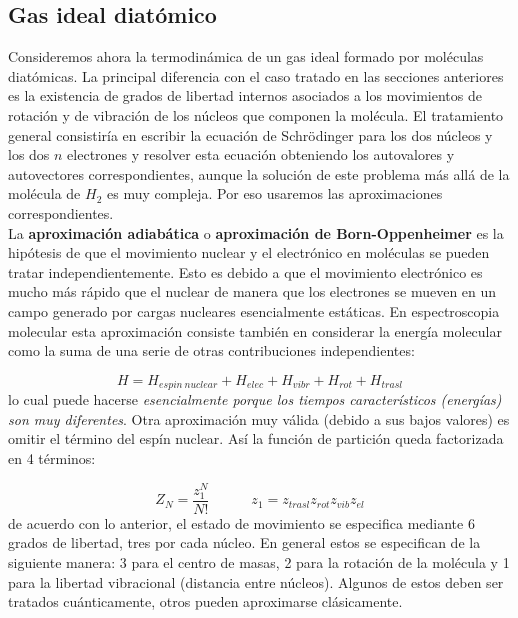 \documentclass[12pt,a4paper]{article}
\numberwithin{equation}{section}
\numberwithin{figure}{section}
\newcommand{\tquad}{\quad \quad \quad}
\theoremstyle{definition}
\begin{document}
\subsection{Gas ideal diatómico}

Consideremos ahora la termodinámica de un gas ideal formado por moléculas diatómicas. La principal diferencia con el caso tratado en las secciones anteriores es la existencia de grados de libertad internos asociados a los movimientos de rotación y de vibración de los núcleos que componen la molécula. El tratamiento general consistiría en escribir la ecuación de Schrödinger para los dos núcleos y los dos $n$ electrones y resolver esta ecuación obteniendo los autovalores y autovectores correspondientes, aunque la solución de este problema más allá de la molécula de $H_2$ es muy compleja. Por eso usaremos las aproximaciones correspondientes. \\

La \textbf{aproximación adiabática} o \textbf{aproximación de Born-Oppenheimer} es la hipótesis de que el movimiento nuclear y el electrónico en moléculas se pueden tratar independientemente. Esto es debido a que el movimiento electrónico es mucho más rápido que el nuclear de manera que los electrones se mueven en un campo generado por cargas nucleares esencialmente estáticas. En espectroscopia molecular esta aproximación consiste también en considerar la energía molecular como la suma de una serie de otras contribuciones independientes:

\begin{equation}
H = H_{espin \ nuclear} + H_{elec} + H_{vibr} + H_{rot} + H_{trasl}
\end{equation}
lo cual puede hacerse \textit{esencialmente porque los tiempos característicos (energías) son muy diferentes}. Otra aproximación muy válida (debido a sus bajos valores) es omitir el término del espín nuclear. Así la función de partición queda factorizada en 4 términos:

\begin{equation}
Z_N = \frac{z_1^N}{N!} \tquad z_1 = z_{trasl} z_{rot} z_{vib} z_{el}
\end{equation}
de acuerdo con lo anterior, el estado de movimiento se especifica mediante 6 grados de libertad, tres por cada núcleo. En general estos se especifican de la siguiente manera: 3 para el centro de masas, 2 para la rotación de la molécula y 1 para la libertad vibracional (distancia entre núcleos). Algunos de estos deben ser tratados cuánticamente, otros pueden aproximarse clásicamente. 
\end{document}
